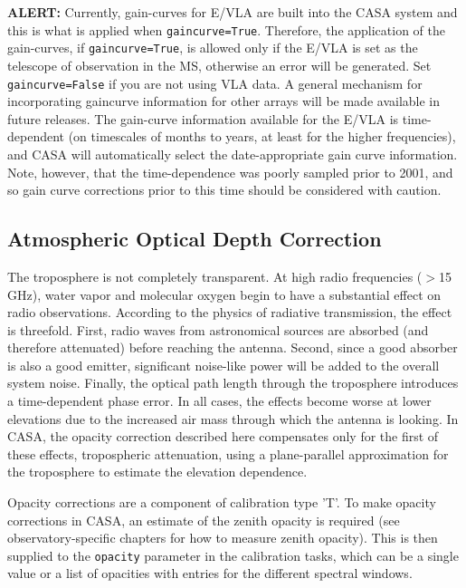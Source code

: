 {\bf ALERT:} Currently, gain-curves for E/VLA are built into
the CASA system and this is what is applied when {\tt gaincurve=True}.
Therefore, the application of the gain-curves, if {\tt gaincurve=True},
is allowed only if the E/VLA is set as the telescope of observation
in the MS, otherwise an error will be generated.
Set {\tt gaincurve=False} if you are not using VLA data.  
A general mechanism for incorporating gaincurve information for
other arrays will be made available in future releases.
The gain-curve information available for the E/VLA is
time-dependent (on timescales of months to years, at least for the 
higher frequencies), and CASA will automatically select 
the date-appropriate gain curve information.  Note, however, that 
the time-dependence was poorly sampled prior to 2001, and so gain 
curve corrections prior to this time should be considered with caution.  


\subsection{Atmospheric Optical Depth Correction}
\label{section:cal.prior.opacity}

The troposphere is not completely transparent.  At high radio
frequencies ($>$15 GHz), water vapor and molecular oxygen begin to
have a substantial effect on radio observations. According to the
physics of radiative transmission, the effect is threefold.  First,
radio waves from astronomical sources are absorbed (and therefore
attenuated) before reaching the antenna.  Second, since a good absorber
is also a good emitter, significant noise-like power will be added to
the overall system noise.  Finally, the optical path length through
the troposphere introduces a time-dependent phase error.  In all
cases, the effects become worse at lower elevations due to the
increased air mass through which the antenna is looking.  In CASA,
the opacity correction described here compensates only for the first
of these effects, tropospheric attenuation, using a plane-parallel
approximation for the troposphere to estimate the elevation
dependence.

Opacity corrections are a component of calibration type 'T'.  To make
opacity corrections in CASA, an estimate of the zenith opacity is
required (see observatory-specific chapters for how to measure zenith
opacity).  This is then supplied to the {\tt opacity} parameter in
the calibration tasks, which can be a single value or a list of
opacities with entries for the different spectral windows.

